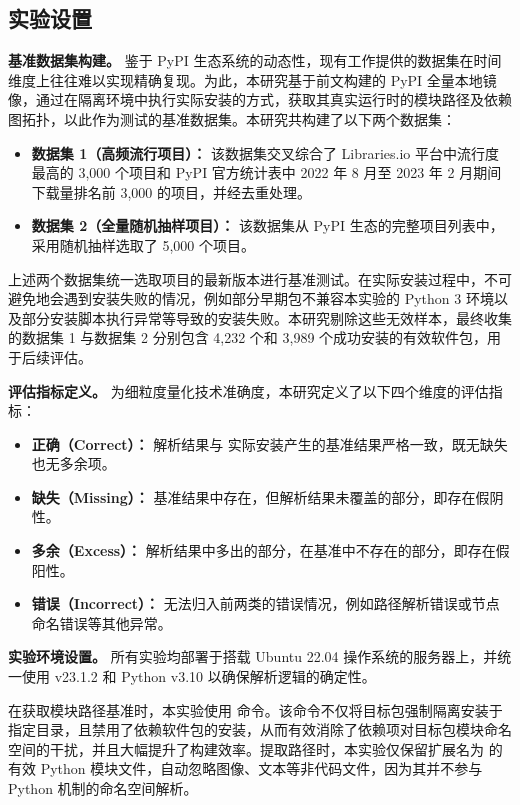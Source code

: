 \subsection{实验设置}
\textbf{基准数据集构建。}
鉴于 PyPI 生态系统的动态性，现有工作提供的数据集在时间维度上往往难以实现精确复现。为此，本研究基于前文构建的 PyPI 全量本地镜像，通过在隔离环境中执行实际安装的方式，获取其真实运行时的模块路径及依赖图拓扑，以此作为测试的基准数据集。本研究共构建了以下两个数据集：

\begin{itemize}
\item \textbf{数据集 1（高频流行项目）：} 该数据集交叉综合了 Libraries.io 平台中流行度最高的 3,000 个项目和 PyPI 官方统计表中 2022 年 8 月至 2023 年 2 月期间下载量排名前 3,000 的项目，并经去重处理。
\item \textbf{数据集 2（全量随机抽样项目）：} 该数据集从 PyPI 生态的完整项目列表中，采用随机抽样选取了 5,000 个项目。
\end{itemize}

上述两个数据集统一选取项目的最新版本进行基准测试。在实际安装过程中，不可避免地会遇到安装失败的情况，例如部分早期包不兼容本实验的 Python 3 环境以及部分安装脚本执行异常等导致的安装失败。本研究剔除这些无效样本，最终收集的数据集 1 与数据集 2 分别包含 4,232 个和 3,989 个成功安装的有效软件包，用于后续评估。

\textbf{评估指标定义。}
为细粒度量化技术准确度，本研究定义了以下四个维度的评估指标：
\begin{itemize}
\item \textbf{正确（Correct）：} 解析结果与  实际安装产生的基准结果严格一致，既无缺失也无多余项。
\item \textbf{缺失（Missing）：} 基准结果中存在，但解析结果未覆盖的部分，即存在假阴性。
\item \textbf{多余（Excess）：} 解析结果中多出的部分，在基准中不存在的部分，即存在假阳性。
\item \textbf{错误（Incorrect）：} 无法归入前两类的错误情况，例如路径解析错误或节点命名错误等其他异常。
\end{itemize}

\textbf{实验环境设置。}
所有实验均部署于搭载 Ubuntu 22.04 操作系统的服务器上，并统一使用  v23.1.2 和 Python v3.10 以确保解析逻辑的确定性。

在获取模块路径基准时，本实验使用  命令。该命令不仅将目标包强制隔离安装于指定目录，且禁用了依赖软件包的安装，从而有效消除了依赖项对目标包模块命名空间的干扰，并且大幅提升了构建效率。提取路径时，本实验仅保留扩展名为  的有效 Python 模块文件，自动忽略图像、文本等非代码文件，因为其并不参与 Python  机制的命名空间解析。

